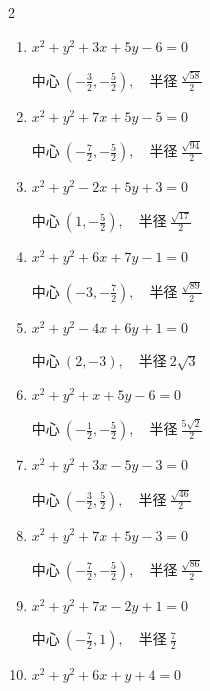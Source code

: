 \begin{multicols}{2}
\begin{enumerate}
        $\displaystyle 中心\: \left(\frac{5}{2},-3\right), \quad 半径 \ \frac{\sqrt{53}}{2}$

  \item $x^{2}+y^{2}+3x+5y-6=0$

        $\displaystyle 中心\: \left(-\frac{3}{2},-\frac{5}{2}\right), \quad 半径 \ \frac{\sqrt{58}}{2}$

  \item $x^{2}+y^{2}+7x+5y-5=0$

        $\displaystyle 中心\: \left(-\frac{7}{2},-\frac{5}{2}\right), \quad 半径 \ \frac{\sqrt{94}}{2}$

  \item $x^{2}+y^{2}-2x+5y+3=0$

        $\displaystyle 中心\: \left(1,-\frac{5}{2}\right), \quad 半径 \ \frac{\sqrt{17}}{2}$

  \item $x^{2}+y^{2}+6x+7y-1=0$

        $\displaystyle 中心\: \left(-3,-\frac{7}{2}\right), \quad 半径 \ \frac{\sqrt{89}}{2}$

\columnbreak %

\resetques

  \item $x^{2}+y^{2}-4x+6y+1=0$

        $\displaystyle 中心\: \left(2,-3\right), \quad 半径 \ 2\sqrt{3}$

  \item $x^{2}+y^{2}+x+5y-6=0$

        $\displaystyle 中心\: \left(-\frac{1}{2},-\frac{5}{2}\right), \quad 半径 \ \frac{5\sqrt{2}}{2}$

  \item $x^{2}+y^{2}+3x-5y-3=0$

        $\displaystyle 中心\: \left(-\frac{3}{2},\frac{5}{2}\right), \quad 半径 \ \frac{\sqrt{46}}{2}$

  \item $x^{2}+y^{2}+7x+5y-3=0$

        $\displaystyle 中心\: \left(-\frac{7}{2},-\frac{5}{2}\right), \quad 半径 \ \frac{\sqrt{86}}{2}$

  \item $x^{2}+y^{2}+7x-2y+1=0$

        $\displaystyle 中心\: \left(-\frac{7}{2},1\right), \quad 半径 \ \frac{7}{2}$

  \item $x^{2}+y^{2}+6x+y+4=0$


\end{enumerate}
\end{multicols}
